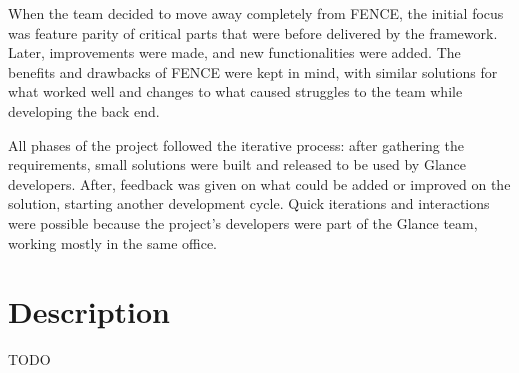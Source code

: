 When the team decided to move away completely from FENCE, the initial focus was feature parity of critical parts that were before delivered by the framework. Later, improvements were made, and new functionalities were added. The benefits and drawbacks of FENCE were kept in mind, with similar solutions for what worked well and changes to what caused struggles to the team while developing the back end.

All phases of the project followed the iterative process: after gathering the requirements, small solutions were built and released to be used by Glance developers. After, feedback was given on what could be added or improved on the solution, starting another development cycle. Quick iterations and interactions were possible because the project’s developers were part of the Glance team, working mostly in the same office. 

\section{Description}

TODO